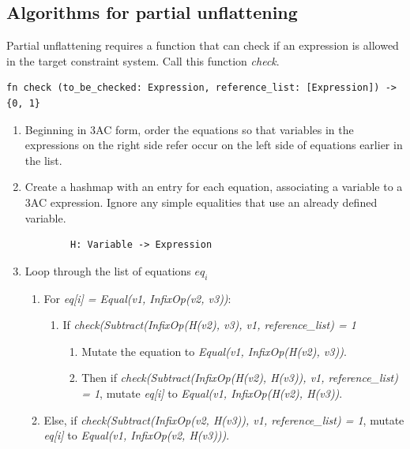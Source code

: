 \documentclass[
    9pt,            %
    techreport,        %
    affiltop,       %
]{art}
\begin{document}
\subsection{Algorithms for partial unflattening}

Partial unflattening requires a function that can check if an expression is allowed in the target constraint system. Call this function \textit{check}.

\begin{verbatim}
fn check (to_be_checked: Expression, reference_list: [Expression]) -> {0, 1}
\end{verbatim}

\begin{enumerate}
    \item Beginning in 3AC form, order the equations so that variables in the expressions on the right side refer occur on the left side of equations earlier in the list.
    \item Create a hashmap with an entry for each equation, associating a variable to a 3AC expression. Ignore any simple equalities that use an already defined variable.
        \begin{verbatim}
        H: Variable -> Expression
        \end{verbatim}
    \item Loop through the list of equations $eq_i$
        \begin{enumerate}
            \item For \textit{eq[i] = Equal(v1, InfixOp(v2, v3))}:
                \begin{enumerate}
                    \item If \textit{check(Subtract(InfixOp(H(v2), v3), v1, reference\_list) = 1}
                        \begin{enumerate} 
                            \item Mutate the equation to \textit{Equal(v1, InfixOp(H(v2), v3))}.
                            \item Then if \textit{check(Subtract(InfixOp(H(v2), H(v3)), v1, reference\_list) = 1}, mutate \textit{eq[i]} to \textit{Equal(v1, InfixOp(H(v2), H(v3))}.
                        \end{enumerate}
                \end{enumerate}
            \item Else, if \textit{check(Subtract(InfixOp(v2, H(v3)), v1, reference\_list) = 1}, mutate \textit{eq[i]} to \textit{Equal(v1, InfixOp(v2, H(v3)))}.
        \end{enumerate}
\end{enumerate}
            
\end{document}
